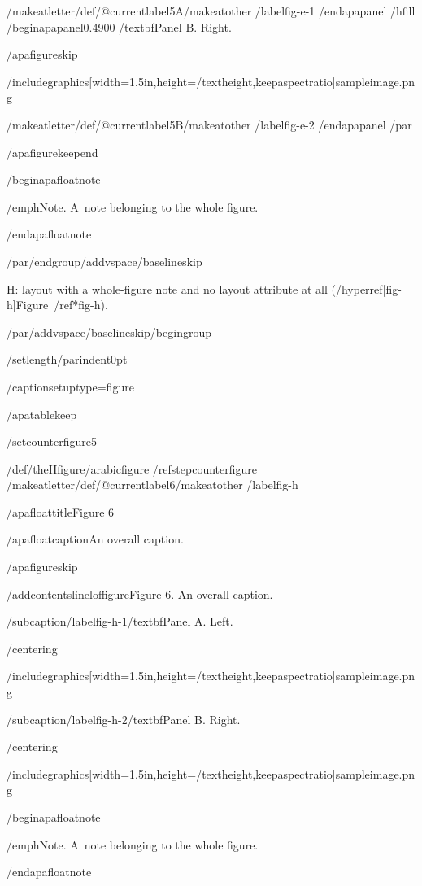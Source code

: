 /makeatletter/def/@currentlabel{5A}/makeatother%
/label{fig-e-1}
/end{apapanel}%
/hfill
/begin{apapanel}{0.4900}%
/textbf{Panel B}. Right.

/apafigureskip

/includegraphics[width=1.5in,height=/textheight,keepaspectratio]{sampleimage.png}

/makeatletter/def/@currentlabel{5B}/makeatother%
/label{fig-e-2}
/end{apapanel}%
/par

/apafigurekeepend

/begin{apafloatnote}

/emph{Note}. A~note belonging to the whole figure.

/end{apafloatnote}

/par/endgroup/addvspace{/baselineskip}

H: layout with a whole-figure note and no layout attribute at all
(/hyperref[fig-h]{Figure~/ref*{fig-h}}).

/par/addvspace{/baselineskip}/begingroup

/setlength{/parindent}{0pt}

/captionsetup{type=figure}

/apatablekeep

/setcounter{figure}{5}

/def/theHfigure{/arabic{figure}}%
/refstepcounter{figure}%
/makeatletter/def/@currentlabel{6}/makeatother%
/label{fig-h}

/apafloattitle{Figure 6}

/apafloatcaption{An overall caption.}

/apafigureskip

/addcontentsline{lof}{figure}{Figure 6. An overall caption.}

/subcaption{/label{fig-h-1}/textbf{Panel A}. Left.}

/centering{

/includegraphics[width=1.5in,height=/textheight,keepaspectratio]{sampleimage.png}

}

/subcaption{/label{fig-h-2}/textbf{Panel B}. Right.}

/centering{

/includegraphics[width=1.5in,height=/textheight,keepaspectratio]{sampleimage.png}

}

/begin{apafloatnote}

/emph{Note}. A~note belonging to the whole figure.

/end{apafloatnote}

